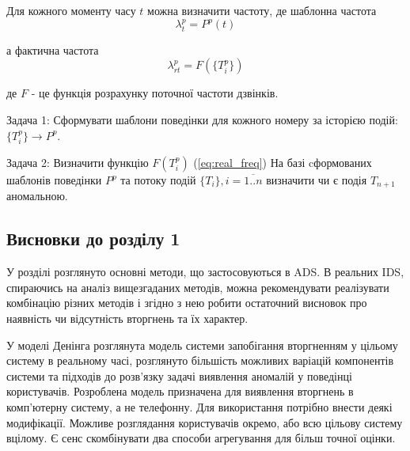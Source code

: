   Для кожного моменту часу $t$ можна визначити частоту, де шаблонна частота 
\begin{equation}\label{eq:pattern_freq} \lambda_t^p = P^p(t) \end{equation}

  а фактична частота
 \begin{equation}\label{eq:real_freq} \lambda_{rt}^p = F(\{T_i^p\}) \end{equation}
 \begin{ESKDexplanation}
    \item де $F$ - це функція розрахунку поточної частоти дзвінків.
  \end{ESKDexplanation}

  Задача 1: Сформувати шаблони поведінки для кожного номеру за історією подій: $\{T_i^{p}\} \rightarrow P^{p}$.

  Задача 2: Визначити функцію $F({T_i^p})$ (\ref{eq:real_freq}) На базі cформованих шаблонів поведінки $P^{p}$ та потоку подій $\{T_i\}, i = \overline{1..n}$ визначити чи є подія $T_{n+1}$ аномальною.


\newpage
\subsection*{Висновки до розділу 1}

    У розділі розглянуто основні методи, що застосовуються в ADS. В реальних IDS,
    спираючись на аналіз вищезгаданих методів, можна рекомендувати реалізувати
    комбінацію різних методів і згідно з нею робити остаточний висновок про наявність
    чи відсутність вторгнень та їх характер.

    У моделі Денінга розглянута модель системи запобігання вторгненням у цільому
    систему в реальному часі, розглянуто більшість можливих варіацій компонентів
    системи та підходів до розв'язку задачі виявлення аномалій у поведінці
    користувачів. Розроблена модель призначена для виявлення вторгнень в
    комп'ютерну систему, а не телефонну. Для використання потрібно внести деякі
    модифікації. Можливе розглядання користувачів окремо, або всю цільову
    систему вцілому. Є сенс скомбінувати два способи агрегування для більш
    точної оцінки.
